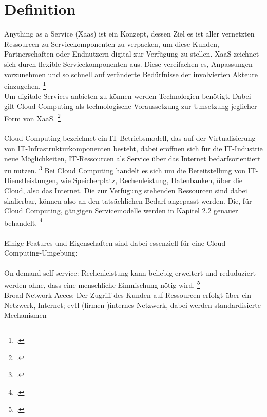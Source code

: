 \documentclass[12pt,toc=bib,toc=listof]{scrreprt}
\begin{document}
\section{Definition} %
\label{sec:Definition}

Anything as a Service (Xaas) ist ein Konzept, dessen Ziel es ist aller vernetzten Ressourcen zu Servicekomponenten zu verpacken, um diese Kunden, Partnerschaften 
oder Endnutzern digital zur Verfügung zu stellen. XaaS zeichnet sich durch flexible Servicekomponenten aus. Diese vereifachen es, Anpassungen vorzunehmen
und so schnell auf veränderte Bedürfnisse der involvierten Akteure einzugehen. \footcite [Vgl.] [] {Riasanow.2020}
\\ 
Um digitale Services anbieten zu können werden Technologien benötigt. Dabei gilt Cloud Computing als technologische Voraussetzung zur Umsetzung jeglicher
Form von XaaS. \footcite [Vgl.] [] {Riasanow.2020}
 \\ \\
Cloud Computing bezeichnet ein IT-Betriebsmodell, das auf der Virtualisierung von IT-Infrastrukturkomponenten besteht, dabei eröffnen 
 sich für die IT-Industrie neue Möglichkeiten, IT-Ressourcen als Service über das Internet bedarfsorientiert zu nutzen. \footcite [Vgl.] [] {Froeschle.2014}
Bei Cloud Computing handelt es sich um die Bereitstellung von IT-Dienstleistungen, wie 
Speicherplatz, Rechenleistung, Datenbanken, über die Cloud, also das Internet. 
Die zur Verfügung stehenden Ressourcen sind dabei skalierbar, können also an den tatsächlichen Bedarf angepasst werden. Die, für Cloud Computing, gängigen Servicemodelle werden
in Kapitel 2.2 genauer behandelt. \footcite [Vgl.] [] {Riasanow.2020}
\\ \\
Einige Features und Eigenschaften sind dabei essenziell für eine Cloud-Computing-Umgebung: 
\\ \\
On-demand self-service: Rechenleistung kann beliebig erweitert und reduduziert werden ohne, 
dass eine menschliche Einmischung nötig wird. \footcite [Vgl.] []{Dangelo.2015} \\
Broad-Network Acces: Der Zugriff des Kunden auf Ressourcen erfolgt über ein Netzwerk, Internet; evtl (firmen-)internes Netzwerk, dabei werden standardisierte Mechanismen 
\end{document}
